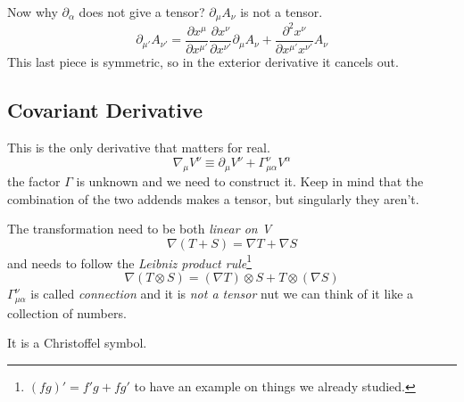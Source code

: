 Now why $\partial_{\alpha }$ does not give a tensor? $\partial_{\mu }A_{\nu }$ is not a tensor.
\[
	\partial_{\mu '}A_{\nu '} = \frac{\partial x^{\mu }}{\partial x^{\mu '}} \frac{\partial x^{\nu }}{\partial x^{\nu '}} \partial_{\mu } A_{\nu } + \frac{\partial^{2}x^{\nu }}{\partial x^{\mu '}x^{\nu '}} A_{\nu }
\]
This last piece is symmetric, so in the exterior derivative it cancels out.\par

\subsection{Covariant Derivative}
This is the only derivative that matters for real.
\[
\nabla_{\mu }V^{\nu } \equiv \partial_{\mu }V^{\nu } + \Gamma ^{\nu }_{\mu \alpha }V^{\alpha }		
\]
the factor $\Gamma $ is unknown and we need to construct it. Keep in mind that the combination of the two addends makes a tensor, but singularly they aren't.

The transformation need to be both \emph{linear on V}
\[
\nabla \left( T+S \right) = \nabla T + \nabla S
\]
and needs to follow the \emph{Leibniz product rule}\footnote{ $\left( fg \right)' = f'g + fg'$ to have an example on things we already studied.}
\[
\nabla \left( T \otimes S \right) = \left( \nabla T \right) \otimes S + T \otimes \left( \nabla S \right)
\]
$\Gamma^{\nu }_{\mu \alpha }$ is called \emph{connection} and it is \emph{not a tensor} nut we can think of it like a collection of numbers. \par
It is a Christoffel symbol.\par

